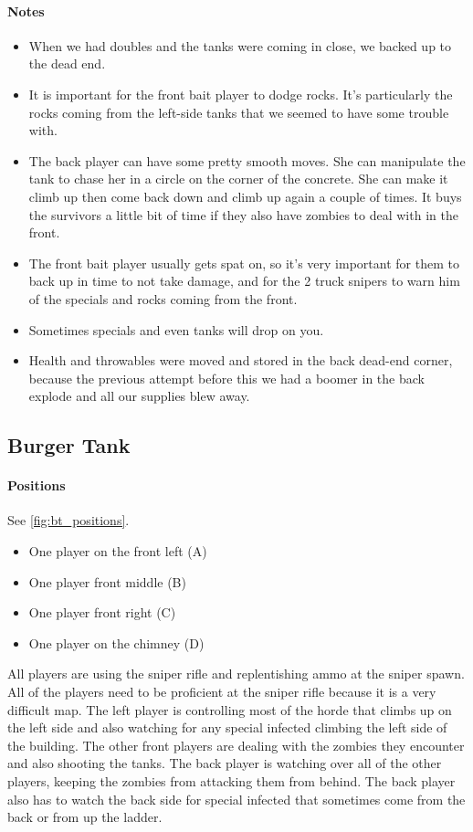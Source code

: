 \paragraph{Notes}
\begin{itemize}
\item When we had doubles and the tanks were coming in close, we backed up to the dead end.
\item It is important for the front bait player to dodge rocks. It's particularly the rocks coming from the left-side tanks that we seemed to have some trouble with. 
\item The back player can have some pretty smooth moves. She can manipulate the tank to chase her in a circle on the corner of the concrete. She can make it climb up then come back down and climb up again a couple of times. It buys the survivors a little bit of time if they also have zombies to deal with in the front.
\item The front bait player usually gets spat on, so it's very important for them to back up in time to not take damage, and for the 2 truck snipers to warn him of the specials and rocks coming from the front.
\item Sometimes specials and even tanks will drop on you.
\item Health and throwables were moved and stored in the back dead-end corner, because the previous attempt before this we had a boomer in the back explode and all our supplies blew away.
\end{itemize}

\subsection{Burger Tank}
\paragraph{Positions}
See \ref{fig:bt_positions}.
\begin{itemize}
\item One player on the front left (A)
\item One player front middle (B)
\item One player front right (C)
\item One player on the chimney (D)
\end{itemize}
All players are using the sniper rifle and replentishing ammo at the sniper spawn. All of the players need to be proficient at the sniper rifle because it is a very difficult map. The left player is controlling most of the horde that climbs up on the left side and also watching for any special infected climbing the left side of the building. The other front players are dealing with the zombies they encounter and also shooting the tanks. The back player is watching over all of the other players, keeping the zombies from attacking them from behind. The back player also has to watch the back side for special infected that sometimes come from the back or from up the ladder.

